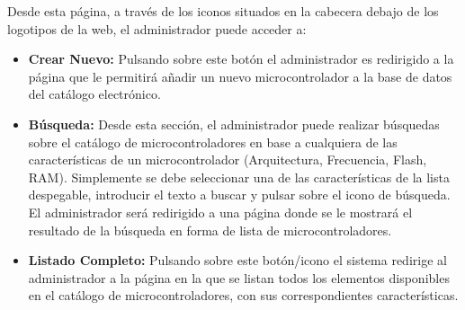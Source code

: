 Desde esta página, a través de los iconos situados en la cabecera debajo de los logotipos de la web, el administrador puede acceder a:
\begin{itemize}
	
	\item \textbf{Crear Nuevo:} Pulsando sobre este botón el administrador es redirigido a la página que le permitirá añadir un nuevo microcontrolador a la base de datos del catálogo electrónico.
	
	\item \textbf{Búsqueda:} Desde esta sección, el administrador puede realizar búsquedas sobre el catálogo de microcontroladores en base a cualquiera de las características de un microcontrolador (Arquitectura, Frecuencia, Flash, RAM). Simplemente se debe seleccionar una de las características de la lista despegable, introducir el texto a buscar y pulsar sobre el icono de búsqueda.
	El administrador será redirigido a una página donde se le mostrará el resultado de la búsqueda en forma de lista de microcontroladores.
	
	\item \textbf{Listado Completo:} Pulsando sobre este botón/icono el sistema redirige al administrador a la página en la que se listan todos los elementos disponibles en el catálogo de microcontroladores, con sus correspondientes características.
	
\end{itemize}